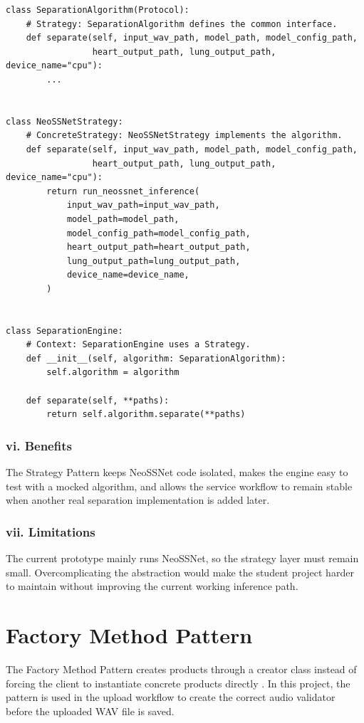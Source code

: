\begin{lstlisting}[caption={Strategy Pattern Code Example}]
class SeparationAlgorithm(Protocol):
    # Strategy: SeparationAlgorithm defines the common interface.
    def separate(self, input_wav_path, model_path, model_config_path,
                 heart_output_path, lung_output_path, device_name="cpu"):
        ...


class NeoSSNetStrategy:
    # ConcreteStrategy: NeoSSNetStrategy implements the algorithm.
    def separate(self, input_wav_path, model_path, model_config_path,
                 heart_output_path, lung_output_path, device_name="cpu"):
        return run_neossnet_inference(
            input_wav_path=input_wav_path,
            model_path=model_path,
            model_config_path=model_config_path,
            heart_output_path=heart_output_path,
            lung_output_path=lung_output_path,
            device_name=device_name,
        )


class SeparationEngine:
    # Context: SeparationEngine uses a Strategy.
    def __init__(self, algorithm: SeparationAlgorithm):
        self.algorithm = algorithm

    def separate(self, **paths):
        return self.algorithm.separate(**paths)
\end{lstlisting}

\subsubsection{vi. Benefits}

The Strategy Pattern keeps NeoSSNet code isolated, makes the engine easy to test with a mocked algorithm, and allows the service workflow to remain stable when another real separation implementation is added later.

\subsubsection{vii. Limitations}

The current prototype mainly runs NeoSSNet, so the strategy layer must remain small. Overcomplicating the abstraction would make the student project harder to maintain without improving the current working inference path.

\section{Factory Method Pattern}

The Factory Method Pattern creates products through a creator class instead of forcing the client to instantiate concrete products directly \parencite{gamma1994designpatterns}. In this project, the pattern is used in the upload workflow to create the correct audio validator before the uploaded WAV file is saved.

